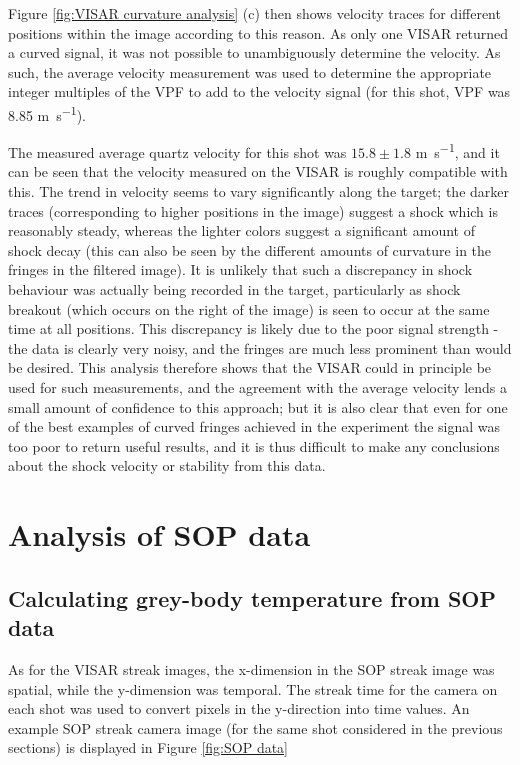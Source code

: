 Figure \ref{fig:VISAR curvature analysis} (c) then shows velocity traces for different positions within the image according to this reason. As only one VISAR returned a curved signal, it was not possible to unambiguously determine the velocity. As such, the average velocity measurement was used to determine the appropriate integer multiples of the VPF to add to the velocity signal (for this shot, VPF was 8.85 \unit{\meter\per\second}).

The measured average quartz velocity for this shot was $15.8 \pm 1.8$ \unit{\meter\per\second}, and it can be seen that the velocity measured on the VISAR is roughly compatible with this. The trend in velocity seems to vary significantly along the target; the darker traces (corresponding to higher positions in the image) suggest a shock which is reasonably steady, whereas the lighter colors suggest a significant amount of shock decay (this can also be seen by the different amounts of curvature in the fringes in the filtered image). It is unlikely that such a discrepancy in shock behaviour was actually being recorded in the target, particularly as shock breakout (which occurs on the right of the image) is seen to occur at the same time at all positions. This discrepancy is likely due to the poor signal strength - the data is clearly very noisy, and the fringes are much less prominent than would be desired. This analysis therefore shows that the VISAR could in principle be used for such measurements, and the agreement with the average velocity lends a small amount of confidence to this approach; but it is also clear that even for one of the best examples of curved fringes achieved in the experiment the signal was too poor to return useful results, and it is thus difficult to make any conclusions about the shock velocity or stability from this data.




\section{Analysis of SOP data} \label{SOP analysis}


\subsection{Calculating grey-body temperature from SOP data}
As for the VISAR streak images, the x-dimension in the SOP streak image was spatial, while the y-dimension was temporal. The streak time for the camera on each shot was used to convert pixels in the y-direction into time values. An example SOP streak camera image (for the same shot considered in the previous sections) is displayed in Figure \ref{fig:SOP data}

